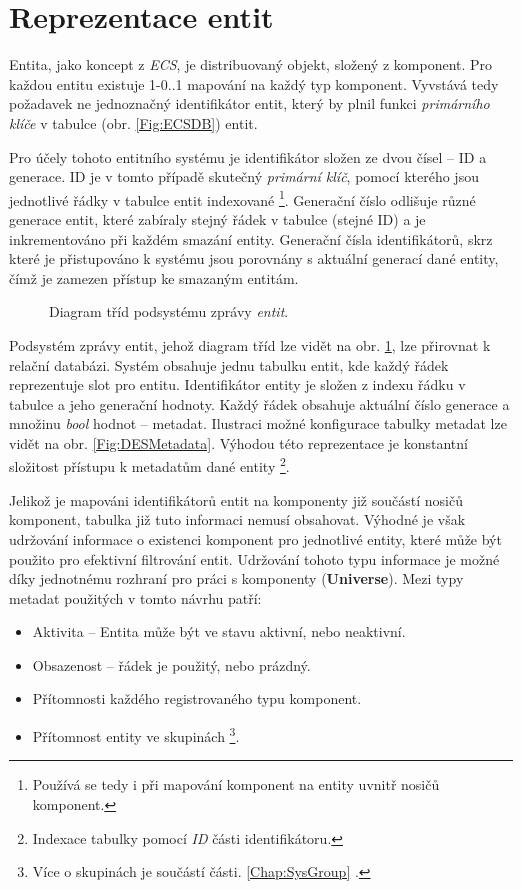\section{Reprezentace entit}

Entita, jako koncept z \emph{ECS}, je distribuovaný objekt, složený z komponent. Pro každou entitu existuje 1-0..1 mapování na každý typ komponent. Vyvstává tedy požadavek ne jednoznačný identifikátor entit, který by plnil funkci \emph{primárního klíče} v tabulce (obr. \ref{Fig:ECSDB}) entit.

Pro účely tohoto entitního systému je identifikátor složen ze dvou čísel -- ID a generace. ID je v tomto případě skutečný \emph{primární klíč}, pomocí kterého jsou jednotlivé řádky v tabulce entit indexované \footnote{Používá se tedy i při mapování komponent na entity uvnitř nosičů komponent.}. Generační číslo odlišuje různé generace entit, které zabíraly stejný řádek v tabulce (stejné ID) a je inkrementováno při každém smazání entity. Generační čísla identifikátorů, skrz které je přistupováno k systému jsou porovnány s aktuální generací dané entity, čímž je zamezen přístup ke smazaným entitám.

\begin{figure}[H]
	\caption{Diagram tříd podsystému zprávy \emph{entit}.}
	\label{Fig:DESEntityDiagram}
\end{figure}

Podsystém zprávy entit, jehož diagram tříd lze vidět na obr. \ref{Fig:DESEntityDiagram}, lze přirovnat k relační databázi. Systém obsahuje jednu tabulku entit, kde každý řádek reprezentuje slot pro entitu. Identifikátor entity je složen z indexu řádku v tabulce a jeho generační hodnoty. Každý řádek obsahuje aktuální číslo generace a množinu \emph{bool} hodnot -- metadat. Ilustraci možné konfigurace tabulky metadat lze vidět na obr. \ref{Fig:DESMetadata}. Výhodou této reprezentace je konstantní složitost přístupu k metadatům dané entity \footnote{Indexace tabulky pomocí \emph{ID} části identifikátoru.}. 

Jelikož je mapováni identifikátorů entit na komponenty již součástí nosičů komponent, tabulka již tuto informaci nemusí obsahovat. Výhodné je však udržování informace o existenci komponent pro jednotlivé entity, které může být použito pro efektivní filtrování entit. Udržování tohoto typu informace je možné díky jednotnému rozhraní pro práci s komponenty (\textbf{Universe}). Mezi typy metadat použitých v tomto návrhu patří: 
\begin{itemize}
	\item Aktivita -- Entita může být ve stavu aktivní, nebo neaktivní.
	\item Obsazenost -- řádek je použitý, nebo prázdný. 
	\item Přítomnosti každého registrovaného typu komponent.
	\item Přítomnost entity ve skupinách \footnote{Více o skupinách je součástí části. \ref{Chap:SysGroup} .}.
\end{itemize}

